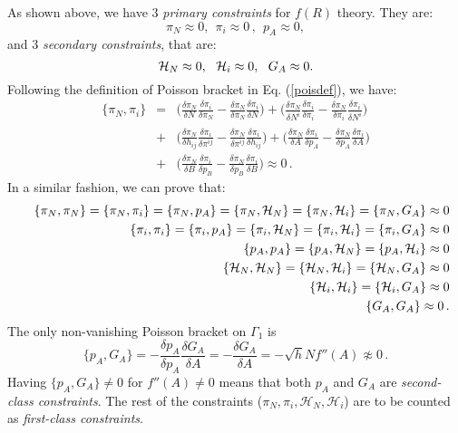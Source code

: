 \documentclass[a4paper,12pt]{article}
\newcommand{\Ga}{\Gamma}
\newcommand{\cH}{{\cal H}}
\newcommand{\+}{^{\dagger}}
\newcommand{\2}{\frac{1}{2}}
\newcommand{\3}{\frac{1}{3}}
\newcommand{\4}{\frac{1}{4}}
\newcommand{\6}{\frac{1}{6}}
\newcommand{\8}{\frac{1}{8}}
\begin{document}
As shown above, we have $3$ {\it primary constraints} for $f(R)$ theory. 
They are: $$\pi_N\approx0,~~\pi_i\approx0\,,~~p_A\approx0,$$
 and $3$ {\it secondary constraints}, that are: 
 $$\mathcal{H}_{N}\approx0,~~\cH_{i}\approx0,~~G_A\approx0. $$ 
Following the definition of Poisson bracket in Eq. (\ref{poisdef}), we have: 
\begin{eqnarray}
\{\pi_N,\pi_i\}&=&\Bigg(\frac{\delta \pi_N}{\delta N_{}}\frac{\delta \pi_i}{\delta
\pi_N}-\frac{\delta \pi_N}{\delta
\pi_N}\frac{\delta \pi_i}{\delta N}\Bigg)+\Bigg(\frac{\delta
\pi_N}{\delta N^{i}_{}}\frac{\delta \pi_i}{\delta
\pi_i}-\frac{\delta \pi_N}{\delta
\pi_i}\frac{\delta \pi_i}{\delta N^{i}}\Bigg)\nonumber\\&+&\Bigg(\frac{\delta \pi_N}{\delta h_{ij}}\frac{\delta \pi_i}{\delta
\pi^{ij}}-\frac{\delta \pi_N}{\delta
\pi^{ij}}\frac{\delta \pi_i}{\delta h_{ij}}\Bigg)+\Bigg(\frac{\delta \pi_N}{\delta A}\frac{\delta \pi_i}{\delta
p_{A}}-\frac{\delta \pi_N}{\delta
p_{A}}\frac{\delta \pi_i}{\delta A}\Bigg)\nonumber\\
&+&\Bigg(\frac{\delta \pi_N}{\delta B}\frac{\delta \pi_i}{\delta
p_{B}}-\frac{\delta \pi_N}{\delta
p_{B}}\frac{\delta \pi_i}{\delta B}\Bigg)\approx0\,.
\end{eqnarray}
In a similar fashion, we can prove that: 
\begin{eqnarray}
&&\{\pi_N,\pi_N\}=\{\pi_N,\pi_i\}=\{\pi_N,p_A\}=\{\pi_N,\mathcal{H}_{N}\}=\{\pi_N,\cH_{i}\}=\{\pi_N,G_{A}\}\approx0\nonumber\\
&&\{\pi_i,\pi_i\}=\{\pi_i,p_A\}=\{\pi_i,\mathcal{H}_{N}\}=\{\pi_i,\cH_{i}\}=\{\pi_i,G_{A}\}\approx0\nonumber\\
&&\{p_A,p_A\}=\{p_A,\mathcal{H}_{N}\}=\{p_A,\cH_{i}\}\approx0\nonumber\\
&&\{\mathcal{H}_{N},\mathcal{H}_{N}\}=\{\mathcal{H}_{N},\cH_{i}\}=\{\mathcal{H}_{N},G_{A}\}\approx0\nonumber\\
&&\{\cH_{i},\cH_{i}\}=\{\mathcal{H}_{i},G_{A}\}\approx0\nonumber\\
&&\{G_{A},G_{A}\}\approx0\,.
\end{eqnarray}
 The only non-vanishing Poisson bracket on $\Ga_1$ is 
\begin{equation}
\{p_A,G_A\}=-\frac{\delta p_A}{\delta
p_{A}}\frac{\delta G_A}{\delta A}
=-\frac{\delta G_A}{\delta A}=-\sqrt{h}Nf''(A)\not\approx 0\,.
\end{equation}
Having $\{p_A,G_A\}\neq 0$ for $f''(A)\neq 0$ means that both $p_A$ and $G_A$ are \textit{second-class
constraints}.  The rest of the constraints ($\pi_N,\pi_i,\mathcal{H}_N,\mathcal{H}_{i}$) are to be counted as \textit{first-class constraints}.
\end{document}

